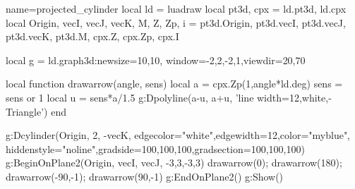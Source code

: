 \documentclass{standalone}
\begin{document}
\begin{luadraw}{name=projected_cylinder}
    local ld = luadraw
    local pt3d, cpx = ld.pt3d, ld.cpx
    local Origin, vecI, vecJ, vecK, M, Z, Zp, i  = pt3d.Origin, pt3d.vecI, pt3d.vecJ, pt3d.vecK, pt3d.M, cpx.Z, cpx.Zp, cpx.I
    
    local g = ld.graph3d:new{size={10,10}, window={-2,2,-2,1},viewdir={20,70}}
    
    local function drawarrow(angle, sens)
        local a = cpx.Zp(1,angle*ld.deg)
        sens = sens or 1
        local u = sens*a/1.5
        g:Dpolyline({a-u, a+u}, 'line width=12,white,-Triangle')
    end
    
    g:Dcylinder(Origin, 2, -vecK, {edgecolor="white",edgewidth=12,color="myblue", hiddenstyle="noline",gradside={100,100,100},gradsection={100,100,100}})
    g:BeginOnPlane2({Origin, vecI, vecJ}, {-3,3,-3,3})
        drawarrow(0); drawarrow(180); drawarrow(-90,-1); drawarrow(90,-1)
    g:EndOnPlane2()
    g:Show()
\end{luadraw}
\end{document}
